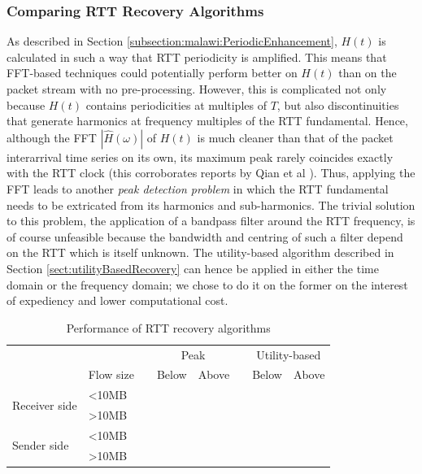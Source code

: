 \subsubsection{Comparing RTT Recovery Algorithms}
\label{sect:comparingRecoveryAlgos}
As described in Section \ref{subsection:malawi:PeriodicEnhancement}, $H(t)$ is calculated in such a way that RTT periodicity is amplified. This means that FFT-based techniques could potentially perform better on $H(t)$ than on the packet stream with no pre-processing. However, this is complicated not only because $H(t)$ contains periodicities at multiples of $T$, but also discontinuities that generate harmonics at frequency multiples of the RTT fundamental. Hence, although the FFT $|\hat{H}(\omega)|$ of $H(t)$ is much cleaner than that of the packet interarrival time series on its own, its maximum peak rarely coincides exactly with the RTT clock (this corroborates reports by Qian et al \cite{Qian:2009p429}). Thus, applying the FFT leads to another \emph{peak detection problem} in which the RTT fundamental needs to be extricated from its harmonics and sub-harmonics. The trivial solution to this problem, the application of a bandpass filter around the RTT frequency, is of course unfeasible because the bandwidth and 
centring of such a filter depend on the RTT which is itself unknown.
The utility-based algorithm described in Section \ref{sect:utilityBasedRecovery} can hence be applied in either the time domain or the frequency domain; we chose to do it on the former on the interest of expediency and lower computational cost.

\newcommand{\RTTHeader}{Below & Above}
\newcommand{\SmallFlowName}{\textless 10MB}
\newcommand{\LargeFlowName}{\textgreater 10MB} 
\begin{table}
\footnotesize
\centering
\begin{tabular}{ p{1.5cm} p{1.2cm} p{0cm} p{.6cm}p{.6cm} p{0cm} p{.6cm}p{.6cm}}
& & & \multicolumn{2}{c}{Peak} & & \multicolumn{2}{c}{Utility-based} \\
\cline{4-5} \cline{7-8}
& Flow size & & \RTTHeader & & \RTTHeader \\
\cline{4-5} \cline{7-8} 
\multirow{2}{*}{Receiver side}  & \SmallFlowName && \\ 
                                & \LargeFlowName && \\
\multirow{2}{*}{Sender side}    & \SmallFlowName && \\
                                & \LargeFlowName && \\
\end{tabular}
\caption{\label{table:rttRecovery}Performance of RTT recovery algorithms}
\vspace{-3mm}
\end{table}

